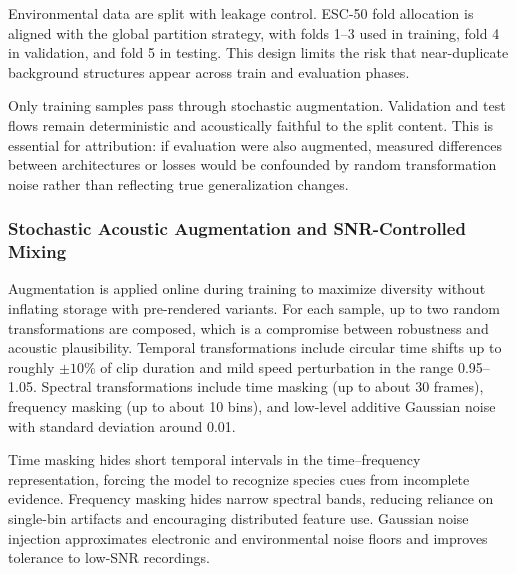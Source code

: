 \documentclass[a4paper,singleside,12pt]{report} %
\begin{document}
	Environmental data are split with leakage control. ESC-50 fold allocation is aligned with the global partition strategy, with folds 1--3 used in training, fold 4 in validation, and fold 5 in testing. This design limits the risk that near-duplicate background structures appear across train and evaluation phases.

	Only training samples pass through stochastic augmentation. Validation and test flows remain deterministic and acoustically faithful to the split content. This is essential for attribution: if evaluation were also augmented, measured differences between architectures or losses would be confounded by random transformation noise rather than reflecting true generalization changes.

	\subsubsection{Stochastic Acoustic Augmentation and SNR-Controlled Mixing}
	Augmentation is applied online during training to maximize diversity without inflating storage with pre-rendered variants. For each sample, up to two random transformations are composed, which is a compromise between robustness and acoustic plausibility. Temporal transformations include circular time shifts up to roughly \(\pm 10\%\) of clip duration and mild speed perturbation in the range 0.95--1.05. Spectral transformations include time masking (up to about 30 frames), frequency masking (up to about 10 bins), and low-level additive Gaussian noise with standard deviation around 0.01.

	Time masking hides short temporal intervals in the time--frequency representation, forcing the model to recognize species cues from incomplete evidence. Frequency masking hides narrow spectral bands, reducing reliance on single-bin artifacts and encouraging distributed feature use. Gaussian noise injection approximates electronic and environmental noise floors and improves tolerance to low-SNR recordings.
\end{document}
